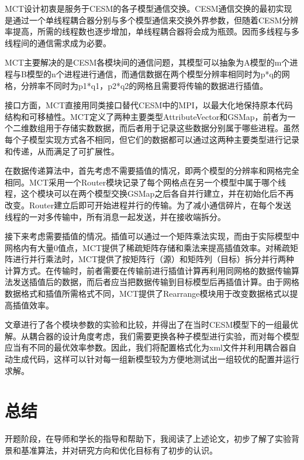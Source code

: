 	MCT设计初衷是服务于CESM的各子模型通信交换。CESM通信交换的最初实现是通过一个单线程耦合器分别与多个模型通信来交换外界参数，但随着CESM分辨率提高，所需的线程数也逐步增加，单线程耦合器将会成为瓶颈。因而多线程与多线程间的通信需求成为必要。

	MCT主要解决的是CESM各模块间的通信问题，其模型可以抽象为A模型的m个进程与B模型的n个进程进行通信，而通信数据在两个模型分辨率相同时为p*q的网格，分辨率不同时为p1*q1，p2*q2的网格且需要将传输的数据进行插值。

	接口方面，MCT直接用同类接口替代CESM中的MPI，以最大化地保持原本代码结构和可移植性。MCT定义了两种主要类型AttributeVector和GSMap，前者为一个二维数组用于存储实数数据，而后者用于记录这些数据分别属于哪些进程。虽然每个子模型实现方式各不相同，但它们的数据都可以通过这两种主要类型进行记录和传递，从而满足了可扩展性。

	在数据传递算法中，首先考虑不需要插值的情况，即两个模型的分辨率和网格完全相同。MCT采用一个Router模块记录了每个网格点在另一个模型中属于哪个线程，这个模块可以在两个模型交换GSMap之后各自并行建立，并在初始化后不再改变。Router建立后即可开始进程并行的传输。为了减小通信碎片，在每个发送线程的一对多传输中，所有消息一起发送，并在接收端拆分。

	接下来考虑需要插值的情况。插值可以通过一个矩阵乘法实现，而由于实际模型中网格内有大量0值点，MCT提供了稀疏矩阵存储和乘法来提高插值效率。对稀疏矩阵进行并行乘法时，MCT提供了按矩阵行（源）和矩阵列（目标）拆分并行两种计算方式。在传输时，前者需要在传输前进行插值计算再利用同网格的数据传输算法发送插值后的数据，而后者应当把数据传输到目标模型后再插值计算。由于网格数据格式和插值所需格式不同，MCT提供了Rearrange模块用于改变数据格式以提高插值效率。

	文章进行了各个模块参数的实验和比较，并得出了在当时CESM模型下的一组最优解。从耦合器的设计角度考虑，我们需要更换各种子模型进行实验，而对每个模型应当有不同的最优效率参数。因此，我们将配置格式化为xml文件并利用耦合器自动生成代码，这样可以针对每一组新模型较为方便地测试出一组较优的配置并运行求解。

\section{总结}

开题阶段，在导师和学长的指导和帮助下，我阅读了上述论文，初步了解了实验背景和基准算法，并对研究方向和优化目标有了初步的认识。